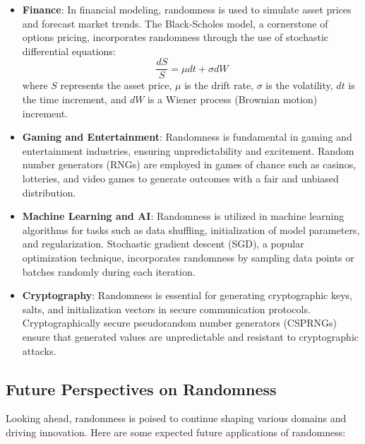 \documentclass[12pt]{book} %
\begin{document}
\begin{itemize}
    \item \textbf{Finance}: In financial modeling, randomness is used to simulate asset prices and forecast market trends. The Black-Scholes model, a cornerstone of options pricing, incorporates randomness through the use of stochastic differential equations:
    \[ \frac{dS}{S} = \mu dt + \sigma dW \]
    where \(S\) represents the asset price, \(\mu\) is the drift rate, \(\sigma\) is the volatility, \(dt\) is the time increment, and \(dW\) is a Wiener process (Brownian motion) increment.
    
    \item \textbf{Gaming and Entertainment}: Randomness is fundamental in gaming and entertainment industries, ensuring unpredictability and excitement. Random number generators (RNGs) are employed in games of chance such as casinos, lotteries, and video games to generate outcomes with a fair and unbiased distribution.
    
    \item \textbf{Machine Learning and AI}: Randomness is utilized in machine learning algorithms for tasks such as data shuffling, initialization of model parameters, and regularization. Stochastic gradient descent (SGD), a popular optimization technique, incorporates randomness by sampling data points or batches randomly during each iteration.
    
    \item \textbf{Cryptography}: Randomness is essential for generating cryptographic keys, salts, and initialization vectors in secure communication protocols. Cryptographically secure pseudorandom number generators (CSPRNGs) ensure that generated values are unpredictable and resistant to cryptographic attacks.
\end{itemize}

\subsection{Future Perspectives on Randomness}
Looking ahead, randomness is poised to continue shaping various domains and driving innovation. Here are some expected future applications of randomness:
\end{document}
